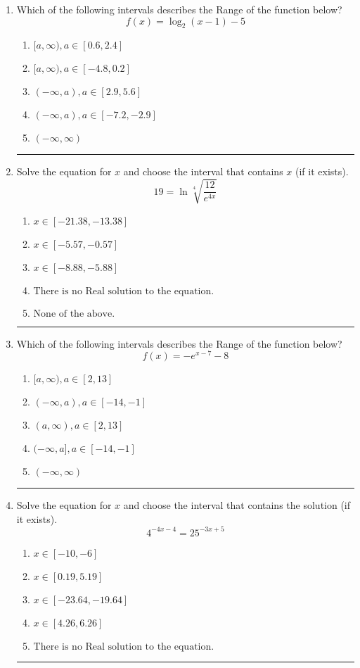 \documentclass[14pt]{extbook}
\newcommand{\litem}[1]{\item#1\hspace*{-1cm}\rule{\textwidth}{0.4pt}}
\begin{document}
\begin{enumerate}
\litem{
Which of the following intervals describes the Range of the function below?\[ f(x) = \log_2{(x-1)}-5 \]\begin{enumerate}[label=\Alph*.]
\item \( [a, \infty), a \in [0.6, 2.4] \)
\item \( [a, \infty), a \in [-4.8, 0.2] \)
\item \( (-\infty, a), a \in [2.9, 5.6] \)
\item \( (-\infty, a), a \in [-7.2, -2.9] \)
\item \( (-\infty, \infty) \)

\end{enumerate} }
\litem{
 Solve the equation for $x$ and choose the interval that contains $x$ (if it exists).\[  19 = \ln{\sqrt[4]{\frac{12}{e^{4x}}}} \]\begin{enumerate}[label=\Alph*.]
\item \( x \in [-21.38, -13.38] \)
\item \( x \in [-5.57, -0.57] \)
\item \( x \in [-8.88, -5.88] \)
\item \( \text{There is no Real solution to the equation.} \)
\item \( \text{None of the above.} \)

\end{enumerate} }
\litem{
Which of the following intervals describes the Range of the function below?\[ f(x) = -e^{x-7}-8 \]\begin{enumerate}[label=\Alph*.]
\item \( [a, \infty), a \in [2, 13] \)
\item \( (-\infty, a), a \in [-14, -1] \)
\item \( (a, \infty), a \in [2, 13] \)
\item \( (-\infty, a], a \in [-14, -1] \)
\item \( (-\infty, \infty) \)

\end{enumerate} }
\litem{
Solve the equation for $x$ and choose the interval that contains the solution (if it exists).\[ 4^{-4x-4} = 25^{-3x+5} \]\begin{enumerate}[label=\Alph*.]
\item \( x \in [-10, -6] \)
\item \( x \in [0.19, 5.19] \)
\item \( x \in [-23.64, -19.64] \)
\item \( x \in [4.26, 6.26] \)
\item \( \text{There is no Real solution to the equation.} \)


\end{enumerate}}
\end{enumerate}
\end{document}
